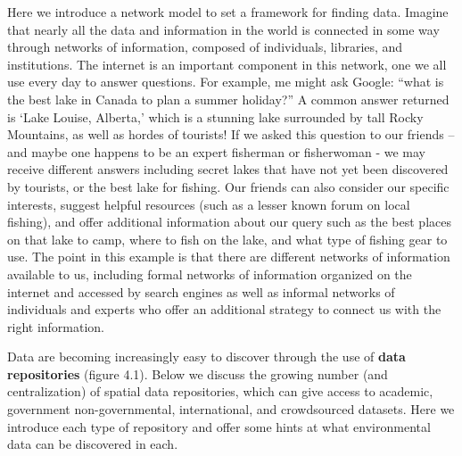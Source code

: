 \documentclass[
]{book}
\begin{document}
Here we introduce a network model to set a framework for finding data. Imagine that nearly all the data and information in the world is connected in some way through networks of information, composed of individuals, libraries, and institutions. The internet is an important component in this network, one we all use every day to answer questions. For example, me might ask Google: ``what is the best lake in Canada to plan a summer holiday?'' A common answer returned is `Lake Louise, Alberta,' which is a stunning lake surrounded by tall Rocky Mountains, as well as hordes of tourists! If we asked this question to our friends -- and maybe one happens to be an expert fisherman or fisherwoman - we may receive different answers including secret lakes that have not yet been discovered by tourists, or the best lake for fishing. Our friends can also consider our specific interests, suggest helpful resources (such as a lesser known forum on local fishing), and offer additional information about our query such as the best places on that lake to camp, where to fish on the lake, and what type of fishing gear to use. The point in this example is that there are different networks of information available to us, including formal networks of information organized on the internet and accessed by search engines as well as informal networks of individuals and experts who offer an additional strategy to connect us with the right information.

Data are becoming increasingly easy to discover through the use of \textbf{data repositories} (figure 4.1). Below we discuss the growing number (and centralization) of spatial data repositories, which can give access to academic, government non-governmental, international, and crowdsourced datasets. Here we introduce each type of repository and offer some hints at what environmental data can be discovered in each.
\end{document}
